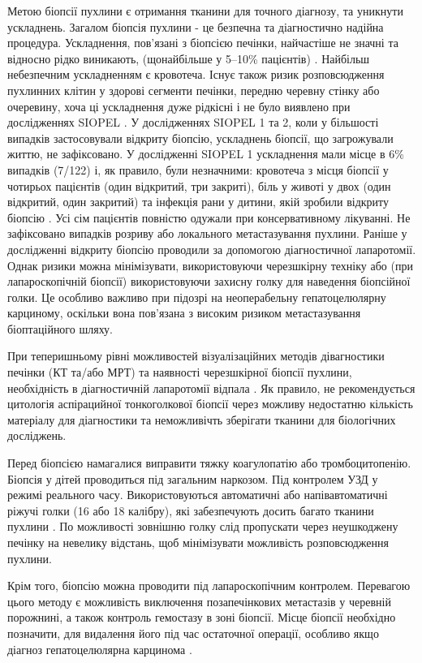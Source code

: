 Метою біопсії пухлини є отримання тканини для точного діагнозу, та уникнути ускладнень. Загалом біопсія пухлини - це безпечна та діагностично надійна процедура. Ускладнення, пов’язані з біопсією печінки, найчастіше не значні та відносно рідко виникають, (щонайбільше у 5–10\% пацієнтів) \cite{pmid27730288}. Найбільш небезпечним ускладненням є кровотеча. Існує також ризик розповсюдження пухлинних клітин у здорові сегменти печінки, передню черевну стінку або очеревину, хоча ці ускладнення дуже рідкісні і не було виявлено при дослідженнях SIOPEL \cite{pmid27781375}. У дослідженнях SIOPEL 1 та 2, коли у більшості випадків застосовували відкриту біопсію, ускладнень біопсії, що загрожували життю, не зафіксовано. У дослідженні SIOPEL 1 ускладнення мали місце в 6\% випадків (7/122) і, як правило, були незначними: кровотеча з місця біопсії у чотирьох пацієнтів (один відкритий, три закриті), біль у животі у двох (один відкритий, один закритий) та інфекція рани у дитини, якій зробили відкриту біопсію \cite{pmid27910913}. Усі сім пацієнтів повністю одужали при консервативному лікуванні. Не зафіксовано випадків розриву або локального метастазування пухлини. Раніше у дослідженні відкриту біопсію проводили за допомогою діагностичної лапаротомії. Однак ризики можна мінімізувати, використовуючи черезшкірну техніку або (при лапароскопічній біопсії) використовуючи захисну голку для наведення біопсійної голки. Це особливо важливо при підозрі на неоперабельну гепатоцелюлярну карциному, оскільки вона пов'язана з високим ризиком метастазування біоптаційного шляху. 

При теперишньому рівні можливостей візуалізаційних методів дівагностики печінки (КТ та/або МРТ) та наявності черезшкірної біопсії пухлини, необхідність в діагностичній лапаротомії відпала \cite{pmid28126357}. Як правило, не рекомендується цитологія аспірацийної тонкоголкової біопсії через можливу недостатню кількість матеріалу для діагностики та неможливічть зберігати тканини для біологічних досліджень.

Перед біопсією намагалися виправити тяжку коагулопатію або тромбоцитопенію. Біопсія у дітей проводиться під загальним наркозом. Під контролем УЗД у режимі реального часу. Використовуються автоматичні або напівавтоматичні ріжучі голки (16 або 18 калібру), які забезпечують досить багато тканини пухлини \cite{pmid28138611}. По можливості зовнішню голку слід пропускати через неушкоджену печінку на невелику відстань, щоб мінімізувати можливість розповсюдження пухлини. 

Крім того, біопсію можна проводити під лапароскопічним контролем. Перевагою цього методу є можливість виключення позапечінкових метастазів у черевній порожнині, а також контроль гемостазу в зоні біопсії. Місце біопсії необхідно позначити, для видалення його під час остаточної операції, особливо якщо діагноз гепатоцелюлярна карцинома \cite{pmid28211941}. 

